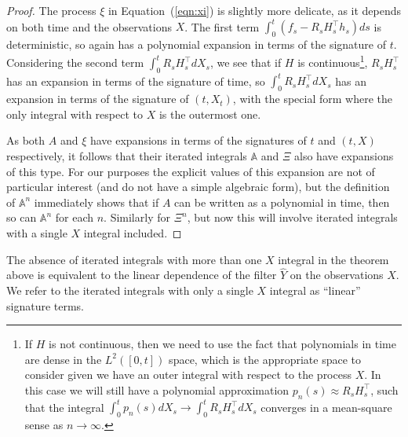 \documentclass[a4paper, 12pt]{article}
\theoremstyle{remark}
\begin{document}
\begin{proof}
The process $\xi$ in Equation~(\ref{eqn:xi}) is slightly more delicate, as it depends on both time and the observations $X$. The first term $\int_0^t (f_s - R_s H_s^\top h_s) ds$ is deterministic, so again has a polynomial expansion in terms of the signature of $t$. Considering the second term $\int_0^t R_sH_s^\top dX_s$, we see that if $H$ is continuous\footnote{If $H$ is not continuous, then we need to use the fact that polynomials in time are dense in the $L^2([0,t])$ space, which is the appropriate space to consider given we have an outer integral with respect to the process $X$. In this case we will still have a polynomial approximation $p_n(s) \approx R_sH_s^\top$, such that the integral $\int_0^t p_n(s) dX_s \to \int_0^t R_s H_s^\top dX_s$ converges in a mean-square sense as $n\to \infty$.}, $R_sH_s^\top$ has an expansion in terms of the signature of time, so $\int_0^t R_sH_s^\top dX_s$ has an expansion in terms of the signature of $(t,X_t)$, with the special form where the only integral with respect to $X$ is the outermost one.

As both $A$ and $\xi$ have expansions in terms of the signatures of $t$ and $(t,X)$ respectively, it follows that their iterated integrals $\mathbb{A}$ and $\Xi$ also have expansions of this type. For our purposes the explicit values of this expansion are not of particular interest (and do not have a simple algebraic form), but the definition of $\mathbb{A}^n$ immediately shows that if $A$ can be written as a polynomial in time, then so can $\mathbb{A}^n$ for each $n$. Similarly for $\Xi^n$, but now this will involve iterated integrals with a single $X$ integral included.

\end{proof}

The absence of iterated integrals with more than one $X$ integral in the theorem above is equivalent to the linear dependence of the filter $\hat Y$ on the observations $X$. We refer to the iterated integrals with only a single $X$ integral as ``linear'' signature terms. 
\end{document}
